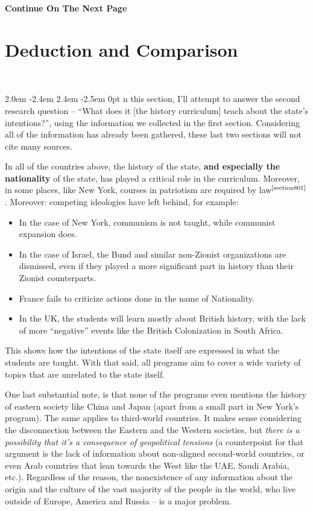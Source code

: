 \documentclass[12pt]{article}
\def\gothstart#1{\noindent\smash{\lower3ex\hbox{\llap{\Huge\gothfamily#1}}}
	\parshape=3 2.0em \dimexpr\hsize-2.4em 2.4em \dimexpr\hsize-2.5em 0pt \hsize}
\newcommand\mc[1]  {$^{\text{\cite{#1}}}$}
\newcommand\aftertitle{\ \!\!\!\!\!\!\!\!\!\!}
\newcommand \npage {\vfil {\hfil \textbf{\footnotesize {Continue On The Next Page}}} \hfil \vfil \pagebreak}
\begin{document}
	
	\npage 
	
	\section{Deduction and Comparison}\aftertitle
	
	\gothstart In this section, I'll attempt to answer the second research question -- ``What does it [the history curriculum] teach about the state's intentions?'', using the information we collected in the first section. Considering all of the information has already been gathered, these last two sections will not cite many sources. 
	
	In all of the countries above, the history of the state, \textbf{and especially the nationality} of the state, has played a critical role in the curriculum. Moreover, in some places, like New York, courses in patriotism are required by law\mc{section801}. 
	Moreover: competing ideologies have left behind, for example:
	\begin{itemize}
		\item In the case of New York, communism is not taught, while communist expansion does. 
		\item In the case of Israel, the Bund and similar non-Zionist organizations are dismissed, even if they played a more significant part in history than their Zionist counterparts. 
		\item France fails to criticize actions done in the name of Nationality. 
		\item In the UK, the students will learn mostly about British history, with the lack of more ``negative'' events like the British Colonization in South Africa. 
	\end{itemize}
	
	This shows how the intentions of the state itself are expressed in what the students are taught. With that said, all programs aim to cover a wide variety of topics that are unrelated to the state itself. 
	
	
	One last substantial note, is that none of the programs even mentions the history of eastern society like China and Japan (apart from a small part in New York's program). The same applies to third-world countries. It makes sense considering the disconnection between the Eastern and the Western societies, but \textit{there is a possibility that it's a consequence of geopolitical tensions} (a counterpoint for that argument is the lack of information about non-aligned second-world countries, or even Arab countries that lean towards the West like the UAE, Saudi Arabia, etc.). Regardless of the reason, the nonexistence of any information about the origin and the culture of the vast majority of the people in the world, who live outside of Europe, America and Russia -- is a major problem. 
	
\end{document}
